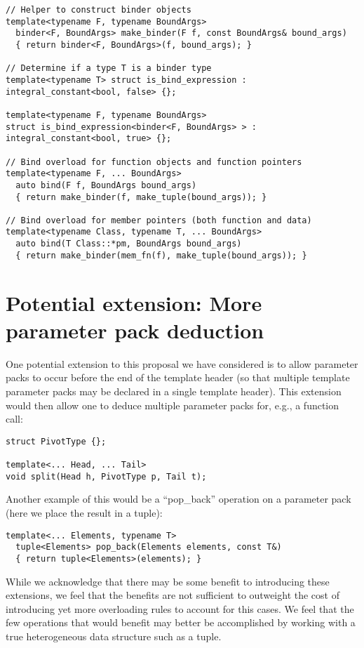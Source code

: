 \documentclass{article}
\begin{document}
\begin{verbatim}
// Helper to construct binder objects
template<typename F, typename BoundArgs>
  binder<F, BoundArgs> make_binder(F f, const BoundArgs& bound_args)
  { return binder<F, BoundArgs>(f, bound_args); }

// Determine if a type T is a binder type
template<typename T> struct is_bind_expression : integral_constant<bool, false> {};

template<typename F, typename BoundArgs>
struct is_bind_expression<binder<F, BoundArgs> > : integral_constant<bool, true> {};

// Bind overload for function objects and function pointers
template<typename F, ... BoundArgs>
  auto bind(F f, BoundArgs bound_args)
  { return make_binder(f, make_tuple(bound_args)); }

// Bind overload for member pointers (both function and data)
template<typename Class, typename T, ... BoundArgs>
  auto bind(T Class::*pm, BoundArgs bound_args)
  { return make_binder(mem_fn(f), make_tuple(bound_args)); }
\end{verbatim}
\normalsize

\section{Potential extension: More parameter pack deduction}
One potential extension to this proposal we have considered is to
allow parameter packs to occur before the end of the template header
(so that multiple template parameter packs may be declared in a single
template header). This extension would then allow one to deduce
multiple parameter packs for, e.g., a function call:

\begin{verbatim}
struct PivotType {};

template<... Head, ... Tail>
void split(Head h, PivotType p, Tail t);
\end{verbatim}

Another example of this would be a ``pop\_back'' operation on a
parameter pack (here we place the result in a tuple):

\begin{verbatim}
template<... Elements, typename T>
  tuple<Elements> pop_back(Elements elements, const T&)
  { return tuple<Elements>(elements); }
\end{verbatim}

While we acknowledge that there may be some benefit to introducing
these extensions, we feel that the benefits are not sufficient to
outweight the cost of introducing yet more overloading rules to
account for this cases. We feel that the few operations that would
benefit may better be accomplished by working with a true
heterogeneous data structure such as a tuple.
\end{document}
